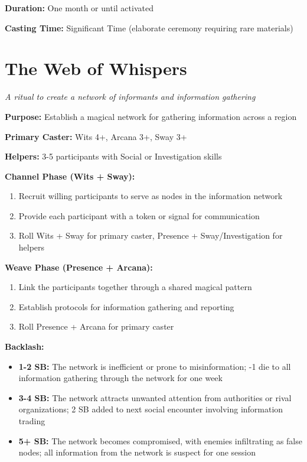 \textbf{Duration:} One month or until activated

\textbf{Casting Time:} Significant Time (elaborate ceremony requiring rare materials)

\section*{The Web of Whispers}
\textit{A ritual to create a network of informants and information gathering}

\textbf{Purpose:} Establish a magical network for gathering information across a region

\textbf{Primary Caster:} Wits 4+, Arcana 3+, Sway 3+

\textbf{Helpers:} 3-5 participants with Social or Investigation skills

\textbf{Channel Phase (Wits + Sway):}
\begin{enumerate}
\item Recruit willing participants to serve as nodes in the information network
\item Provide each participant with a token or signal for communication
\item Roll Wits + Sway for primary caster, Presence + Sway/Investigation for helpers
\end{enumerate}

\textbf{Weave Phase (Presence + Arcana):}
\begin{enumerate}
\item Link the participants together through a shared magical pattern
\item Establish protocols for information gathering and reporting
\item Roll Presence + Arcana for primary caster
\end{enumerate}

\textbf{Backlash:}
\begin{itemize}
\item \textbf{1-2 SB:} The network is inefficient or prone to misinformation; -1 die to all information gathering through the network for one week
\item \textbf{3-4 SB:} The network attracts unwanted attention from authorities or rival organizations; 2 SB added to next social encounter involving information trading
\item \textbf{5+ SB:} The network becomes compromised, with enemies infiltrating as false nodes; all information from the network is suspect for one session
\end{itemize}

